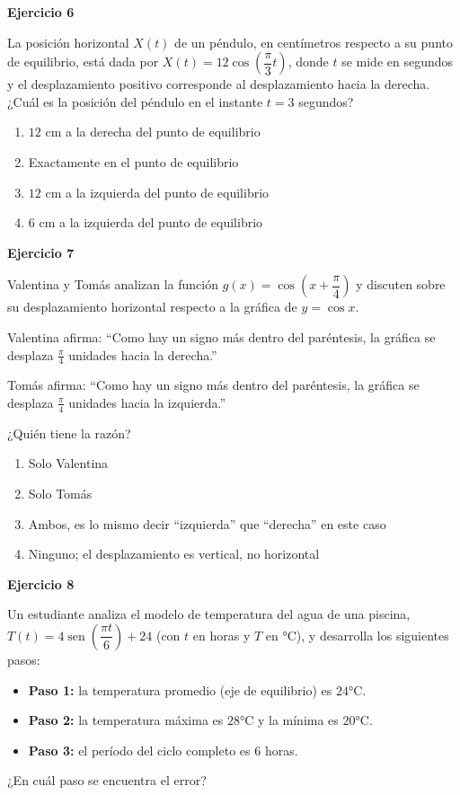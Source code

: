 \documentclass[12pt,letterpaper]{article}
\providecommand{\sen}{\operatorname{sen}}
\begin{document}
\textbf{Ejercicio 6}

La posición horizontal $X(t)$ de un péndulo, en centímetros respecto a su punto de equilibrio, está dada por $X(t)=12\cos\left(\dfrac{\pi}{3}t\right)$, donde $t$ se mide en segundos y el desplazamiento positivo corresponde al desplazamiento hacia la derecha. ¿Cuál es la posición del péndulo en el instante $t=3$ segundos?

\begin{enumerate}[label=\Alph*)]
    \item $12\text{ cm}$ a la derecha del punto de equilibrio
    \item Exactamente en el punto de equilibrio
    \item $12\text{ cm}$ a la izquierda del punto de equilibrio
    \item $6\text{ cm}$ a la izquierda del punto de equilibrio
\end{enumerate}

\vspace{3.5cm}

\textbf{Ejercicio 7}

Valentina y Tomás analizan la función $g(x)=\cos\left(x+\dfrac{\pi}{4}\right)$ y discuten sobre su desplazamiento horizontal respecto a la gráfica de $y=\cos x$.

Valentina afirma: ``Como hay un signo más dentro del paréntesis, la gráfica se desplaza $\frac{\pi}{4}$ unidades hacia la derecha.''

Tomás afirma: ``Como hay un signo más dentro del paréntesis, la gráfica se desplaza $\frac{\pi}{4}$ unidades hacia la izquierda.''

¿Quién tiene la razón?

\begin{enumerate}[label=\Alph*)]
    \item Solo Valentina
    \item Solo Tomás
    \item Ambos, es lo mismo decir ``izquierda'' que ``derecha'' en este caso
    \item Ninguno; el desplazamiento es vertical, no horizontal
\end{enumerate}

\vspace{3.5cm}

\textbf{Ejercicio 8}

Un estudiante analiza el modelo de temperatura del agua de una piscina, $T(t)=4\sen\left(\dfrac{\pi t}{6}\right)+24$ (con $t$ en horas y $T$ en °C), y desarrolla los siguientes pasos:
\begin{itemize}[leftmargin=*]
    \item \textbf{Paso 1:} la temperatura promedio (eje de equilibrio) es $24°\text{C}$.
    \item \textbf{Paso 2:} la temperatura máxima es $28°\text{C}$ y la mínima es $20°\text{C}$.
    \item \textbf{Paso 3:} el período del ciclo completo es $6$ horas.
\end{itemize}
¿En cuál paso se encuentra el error?
\end{document}
